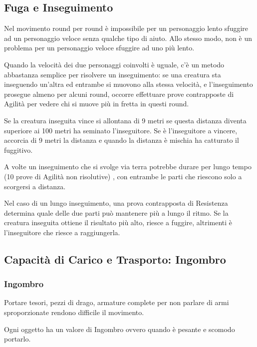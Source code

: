 \documentclass[a4paper,11pt,twoside,openany]{book}
\begin{document}
\subsection{Fuga e Inseguimento}

Nel movimento round per round è impossibile per un personaggio lento sfuggire ad un personaggio veloce senza qualche tipo di aiuto. Allo stesso modo, non è un problema per un personaggio veloce sfuggire ad uno più lento.

Quando la velocità dei due personaggi coinvolti è uguale, c'è un metodo abbastanza semplice per risolvere un inseguimento: se una creatura sta inseguendo un'altra ed entrambe si muovono alla stessa velocità, e l'inseguimento prosegue almeno per alcuni round, occorre effettuare prove contrapposte di Agilità per vedere chi si muove più in fretta in questi round.

Se la creatura inseguita vince si allontana di 9 metri se questa distanza diventa superiore ai 100 metri ha seminato l'inseguitore. Se è l'inseguitore a vincere, accorcia di 9 metri la distanza e quando la distanza è mischia ha catturato il fuggitivo.

A volte un inseguimento che si svolge via terra potrebbe durare per lungo tempo (10 prove di Agilità non risolutive) , con entrambe le parti che riescono solo a scorgersi a distanza.

Nel caso di un lungo inseguimento, una prova contrapposta di Resistenza determina quale delle due parti può mantenere più a lungo il ritmo. Se la creatura inseguita ottiene il risultato più alto, riesce a fuggire, altrimenti è l'inseguitore che riesce a raggiungerla.

\subsection{Capacità di Carico e Trasporto: Ingombro}

\label{sec:capacita-di-carico-e-trasporto-ingombro}

\subsubsection{Ingombro}

Portare tesori, pezzi di drago, armature complete per non parlare di armi sproporzionate rendono difficile il movimento.

Ogni oggetto ha un valore di Ingombro ovvero quando è pesante e scomodo portarlo.
\end{document}
